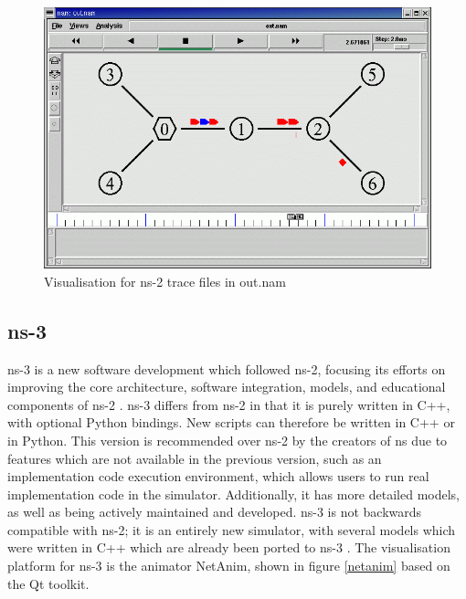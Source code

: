 \begin{figure}
\centering	
\includegraphics[scale=0.4]{img/outnam}	
\caption{ Visualisation for ns-2 trace files in out.nam}
\label{outnam}
\end{figure}

\subsection{ns-3}
ns-3 is a new software development which followed  ns-2, focusing its efforts on improving the core architecture, software integration, models, and educational components of ns-2 \cite{ns2006}. ns-3 differs from ns-2 in that it is purely written in C++, with optional Python bindings. New scripts can therefore be written in C++ or in Python. This version is recommended over ns-2 by the creators of ns due to features which are not available in the previous version, such as an implementation code execution environment, which allows users to run real implementation code in the simulator. Additionally, it has more detailed models, as well as being actively maintained and developed. ns-3 is not backwards compatible with ns-2; it is an entirely new simulator, with several models which were written in C++ which are already been ported to ns-3 \cite{tommasopecorella2016}. The visualisation platform for ns-3 is the animator NetAnim, shown in figure \ref{netanim} based on the Qt toolkit.

